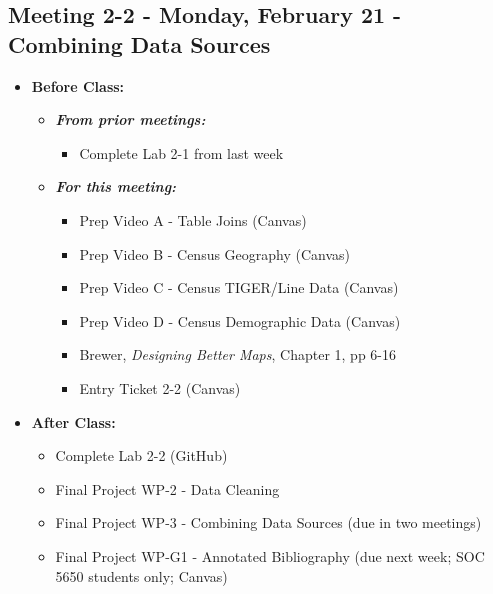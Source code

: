 \documentclass[
]{book}
\providecommand{\tightlist}{%
  \setlength{\itemsep}{0pt}\setlength{\parskip}{0pt}}
\begin{document}
\hypertarget{meeting-2-2---monday-february-21---combining-data-sources}{%
\subsection*{Meeting 2-2 - Monday, February 21 - Combining Data Sources}\label{meeting-2-2---monday-february-21---combining-data-sources}}

\begin{itemize}
\tightlist
\item
  \textbf{Before Class:}

  \begin{itemize}
  \tightlist
  \item
    \textbf{\emph{From prior meetings:}}

    \begin{itemize}
    \tightlist
    \item
      Complete Lab 2-1 from last week
    \end{itemize}
  \item
    \textbf{\emph{For this meeting:}}

    \begin{itemize}
    \tightlist
    \item
      Prep Video A - Table Joins (Canvas)
    \item
      Prep Video B - Census Geography (Canvas)
    \item
      Prep Video C - Census TIGER/Line Data (Canvas)
    \item
      Prep Video D - Census Demographic Data (Canvas)
    \item
      Brewer, \emph{Designing Better Maps}, Chapter 1, pp 6-16
    \item
      Entry Ticket 2-2 (Canvas)
    \end{itemize}
  \end{itemize}
\item
  \textbf{After Class:}

  \begin{itemize}
  \tightlist
  \item
    Complete Lab 2-2 (GitHub)
  \item
    Final Project WP-2 - Data Cleaning
  \item
    Final Project WP-3 - Combining Data Sources (due in two meetings)
  \item
    Final Project WP-G1 - Annotated Bibliography (due next week; SOC 5650 students only; Canvas)
  \end{itemize}
\end{itemize}
\end{document}
